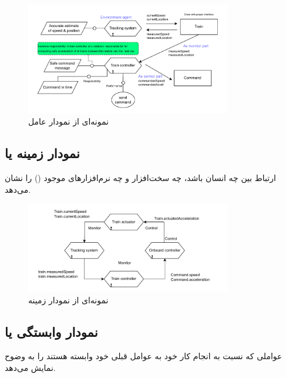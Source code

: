 \begin{figure}[H]
    \centering
    \includegraphics[width=0.8\textwidth]{assets/sample_of_agent_diagram.drawio.pdf}
    \caption{نمونه‌ای از نمودار عامل}
\end{figure}

\subsection{نمودار زمینه یا }

ارتباط بین  چه انسان باشد، چه سخت‌افزار و چه نرم‌افزار‌های موجود
() را نشان می‌دهد.

\begin{figure}[H]
    \centering
    \includegraphics[width=0.8\textwidth]{assets/sample_of_context_diagram.drawio.pdf}
    \caption{نمونه‌ای از نمودار زمینه}
\end{figure}

\subsection{نمودار وابستگی یا }

عواملی که نسبت به انجام کار خود به عوامل قبلی خود وابسته هستند را به وضوح نمایش
می‌دهد.
